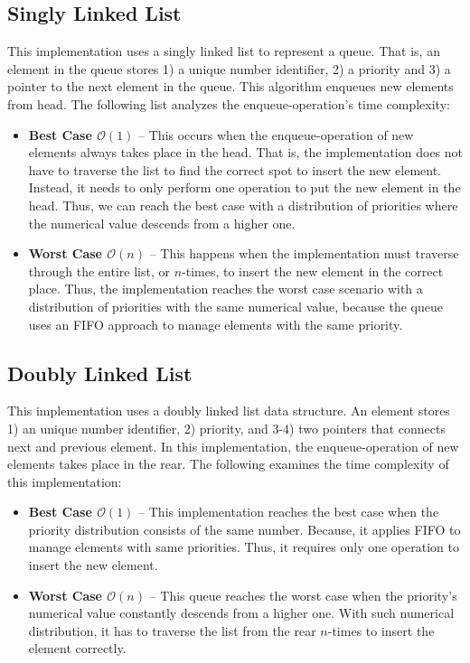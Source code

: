 \documentclass[a4paper,11pt]{kth-mag}
\begin{document}
\subsection{Singly Linked List}\label{sec:singly}
This implementation uses a singly linked list to represent a queue.
That is, an element in the queue stores 1) a unique number identifier, 2) a priority and 3) a pointer to the next element in the queue.
This algorithm enqueues new elements from head.
The following list analyzes the enqueue-operation's time complexity:
\begin{itemize}
    \item \textbf{Best Case $\mathcal{O}(1)$} -- This occurs when the enqueue-operation of new elements always takes place in the head.
        That is, the implementation does not have to traverse the list to find the correct spot to insert the new element.
        Instead, it needs to only perform one operation to put the new element in the head.
        Thus, we can reach the best case with a distribution of priorities where the numerical value descends from a higher one.
    \item \textbf{Worst Case $\mathcal{O}(n)$} -- This happens when the implementation must traverse through the entire list, or $n$-times, to insert the new element in the correct place.
        Thus, the implementation reaches the worst case scenario with a distribution of priorities with the same numerical value,
because the queue uses an FIFO approach to manage elements with the same priority.
\end{itemize}

\subsection{Doubly Linked List}
This implementation uses a doubly linked list data structure.
An element stores 1) an unique number identifier, 2) priority, and 3-4) two pointers that connects next and previous element.
In this implementation, the enqueue-operation of new elements takes place in the rear.
The following examines the time complexity of this implementation:
\begin{itemize}
    \item \textbf{Best Case $\mathcal{O}(1)$} -- This implementation reaches the best case when the priority distribution consists of the same number.
        Because, it applies FIFO to manage elements with same priorities.
        Thus, it requires only one operation to insert the new element.
    \item \textbf{Worst Case $\mathcal{O}(n)$} --  This queue reaches the worst case when the priority's numerical value constantly descends from a higher one.
        With such numerical distribution, it has to traverse the list from the rear $n$-times to insert the element correctly.
\end{itemize}
\end{document}
